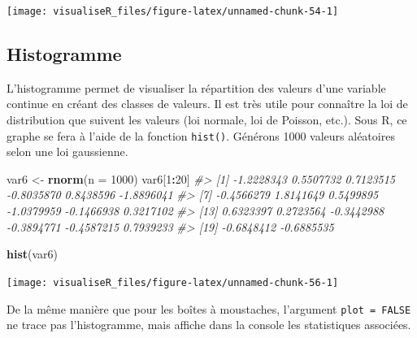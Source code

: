 \documentclass[]{article}
\newenvironment{Shaded}{\begin{snugshade}}{\end{snugshade}}
\newcommand{\CommentTok}[1]{\textcolor[rgb]{0.56,0.35,0.01}{\textit{#1}}}
\newcommand{\DataTypeTok}[1]{\textcolor[rgb]{0.13,0.29,0.53}{#1}}
\newcommand{\DecValTok}[1]{\textcolor[rgb]{0.00,0.00,0.81}{#1}}
\newcommand{\KeywordTok}[1]{\textcolor[rgb]{0.13,0.29,0.53}{\textbf{#1}}}
\newcommand{\NormalTok}[1]{#1}
\newcommand{\OperatorTok}[1]{\textcolor[rgb]{0.81,0.36,0.00}{\textbf{#1}}}
\newcommand{\StringTok}[1]{\textcolor[rgb]{0.31,0.60,0.02}{#1}}
\begin{document}
\begin{center}\texttt{[image: visualiseR\_files/figure-latex/unnamed-chunk-54-1]} \end{center}

\hypertarget{histogramme}{%
\subsection{Histogramme}\label{histogramme}}

L'histogramme permet de visualiser la répartition des valeurs d'une variable continue en créant des classes de valeurs. Il est très utile pour connaître la loi
de distribution que suivent les valeurs (loi normale, loi de Poisson, etc.). Sous R, ce graphe se fera à l'aide de la fonction \texttt{hist()}.
Générons 1000 valeurs aléatoires selon une loi gaussienne.

\begin{Shaded}
\begin{Highlighting}[]
\NormalTok{var6 <-}\StringTok{ }\KeywordTok{rnorm}\NormalTok{(}\DataTypeTok{n =} \DecValTok{1000}\NormalTok{)}
\NormalTok{var6[}\DecValTok{1}\OperatorTok{:}\DecValTok{20}\NormalTok{]}
\CommentTok{#>  [1] -1.2228343  0.5507732  0.7123515 -0.8035870  0.8438596 -1.8896041}
\CommentTok{#>  [7] -0.4566279  1.8141649  0.5499895 -1.0379959 -0.1466938  0.3217102}
\CommentTok{#> [13]  0.6323397  0.2723564 -0.3442988 -0.3894771 -0.4587215  0.7939233}
\CommentTok{#> [19] -0.6848412 -0.6885535}
\end{Highlighting}
\end{Shaded}

\begin{Shaded}
\begin{Highlighting}[]
\KeywordTok{hist}\NormalTok{(var6)}
\end{Highlighting}
\end{Shaded}

\begin{center}\texttt{[image: visualiseR\_files/figure-latex/unnamed-chunk-56-1]} \end{center}

De la même manière que pour les boîtes à moustaches, l'argument \texttt{plot\ =\ FALSE} ne trace pas l'histogramme, mais affiche dans la console les statistiques associées.
\end{document}
